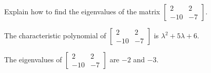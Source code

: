 
\begin{exerciseStatement}


Explain how to find the eigenvalues of the matrix \( \left[\begin{array}{cc}
2 & 2 \\
-10 & -7
\end{array}\right] \).


\end{exerciseStatement}
    
\begin{exerciseAnswer} 


The characteristic polynomial of \( \left[\begin{array}{cc}
2 & 2 \\
-10 & -7
\end{array}\right] \) is \( \lambda^{2} + 5 \lambda + 6 \).



The eigenvalues of \( \left[\begin{array}{cc}
2 & 2 \\
-10 & -7
\end{array}\right] \) are \( -2 \) and \( -3 \).


\end{exerciseAnswer}
    
